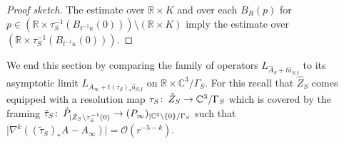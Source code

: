 \documentclass[11pt,a4paper]{scrartcl}
\newcommand{\col}{\colon \thinspace}
\numberwithin{equation}{section}
\theoremstyle{plain}
\theoremstyle{definition}
\theoremstyle{remark}
\begin{document}
\begin{proof}[Proof sketch]
The estimate over $\mathbb{R}\times K$ and over each $B_R(p)$ for $p \in (\mathbb{R}\times \tau_S^{-1}(B_{t^{-1}\kappa}(0)))\setminus (\mathbb{R}\times K)$ imply the estimate over $(\mathbb{R}\times \tau_S^{-1}(B_{t^{-1}\kappa}(0)))$.
\end{proof}



We end this section by comparing the family of operators $L_{\hat{A}_S+t\hat{a}_{S,\mathfrak{f}}}$ to its asymptotic limit $L_{A_\infty+t (\tau_S)_*\hat{a}_{S,\mathfrak{f}}}$ on $\mathbb{R}\times \mathbb{C}^3/\Gamma_S$. For this recall that $\hat{Z}_S$ comes equipped with a resolution map $\tau_S \col \hat{Z}_S \to \mathbb{C}^3/\Gamma_S$ which is covered by the framing $\tilde{\tau}_S \col \hat{P}_{\vert \hat{Z}_S\setminus \tau_S^{-1}(0)} \to (P_\infty)_{\vert \mathbb{C}^3\setminus\{0\}/\Gamma_S}$ such that $\vert \nabla^k ((\tilde{\tau}_S)_*A - A_\infty)\vert = \mathcal{O}(r^{-5-k})$. 
\end{document}
